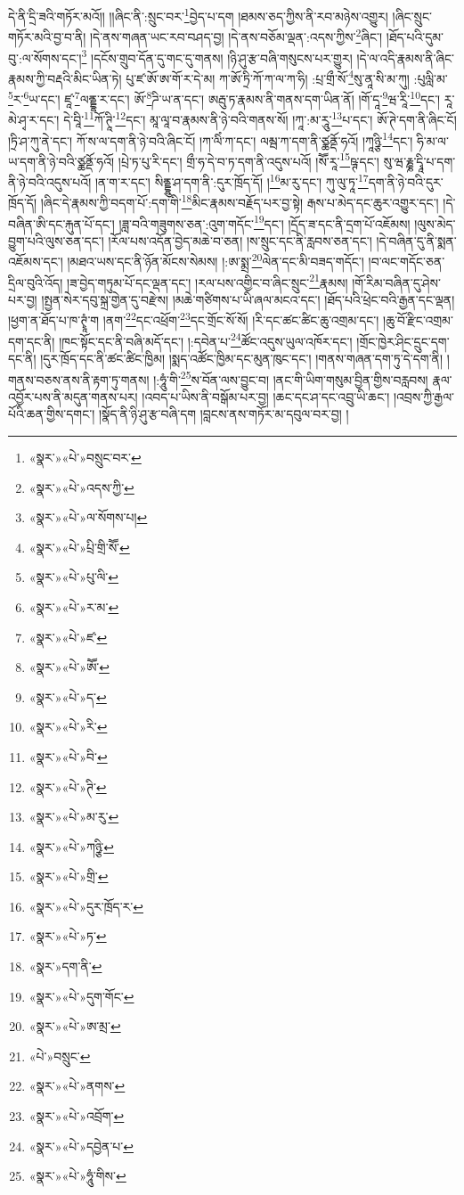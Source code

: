 དེ་ནི་དྲི་ཟའི་གཏོར་མའོ།། །།ཞིང་ནི་:སྲུང་བར་\footnote{«སྣར་»«པེ་»བསྲུང་བར་}བྱེད་པ་དག །ཐམས་ཅད་ཀྱིས་ནི་རབ་མཉེས་འགྱུར། །ཞིང་སྲུང་གཏོར་མའི་བྱ་བ་ནི། །དེ་ནས་གཞན་ཡང་རབ་བཤད་བྱ། །དེ་ནས་བཅོམ་ལྡན་:འདས་ཀྱིས་\footnote{«སྣར་»«པེ་»འདས་ཀྱི་}ཞིང་། །ཐོད་པའི་དུམ་བུ་:ལ་སོགས་དང་།\footnote{«སྣར་»«པེ་»ལ་སོགས་པ།} །དངོས་གྲུབ་དོན་དུ་གང་དུ་གནས། །ཉི་ཤུ་རྩ་བཞི་གསུངས་པར་གྱུར། །དེ་ལ་འདི་རྣམས་ནི་ཞིང་རྣམས་ཀྱི་བརྡའི་མིང་ཡིན་ཏེ། པུ་ཛ་ཨོ་ཨ་གོ་ར་དེ་མ། ཀ་ཨོ་ཏྲི་ཀོ་ཀ་ལ་ཀ་ཧི། :པྲ་གྲྀ་སོ་\footnote{«སྣར་»«པེ་»པྲི་གྲི་སཽ་}སུ་ནཱ་སི་མ་ཀུ། :པུལླི་མ་\footnote{«སྣར་»«པེ་»པུ་ལི་}ར་\footnote{«སྣར་»«པེ་»ར་མ་}ཡ་དང་། ཛཱ་\footnote{«སྣར་»«པེ་»ཛ་}ལནྡྷ་ར་དང་། ཨོ་\footnote{«སྣར་»«པེ་»ཨཽ་}ཌི་ཡ་ན་དང་། ཨརྦུ་ཏ་རྣམས་ནི་གནས་དག་ཡིན་ནོ། །གོ་དཱ་\footnote{«སྣར་»«པེ་»ད་}ཝ་རཱི་\footnote{«སྣར་»«པེ་»རི་}དང་། རཱ་མེ་ཤྭ་ར་དང་། དེ་བཱི་\footnote{«སྣར་»«པེ་»བི་}ཀོ་ཊཱི་\footnote{«སྣར་»«པེ་»ཊི་}དང་། མཱ་ལཱ་བ་རྣམས་ནི་ཉེ་བའི་གནས་སོ། །ཀཱ་:མ་རཱུ་\footnote{«སྣར་»«པེ་»མ་རུ་}པ་དང་། ཨོ་ཊེ་དག་ནི་ཞིང་ངོ། །ཏྲི་ཤ་ཀུ་ནེ་དང་། ཀོ་ས་ལ་དག་ནི་ཉེ་བའི་ཞིང་ངོ། །ཀ་ལིཾ་ཀ་དང་། ལམྦ་ཀ་དག་ནི་ཙྪནྡོ་ཧའོ། །ཀཱཉྩི་\footnote{«སྣར་»«པེ་»ཀཉྩི་}དང་། ཧི་མ་ལ་ཡ་དག་ནི་ཉེ་བའི་ཙྪནྡོ་ཧའོ། །པྲེ་ཏ་པུ་རི་དང་། གྲྀ་ཧ་དེ་བ་ཏ་དག་ནི་འདུས་པའོ། །སཽ་རཱ་\footnote{«སྣར་»«པེ་»གྲི་}ཥྚ་དང་། སུ་ཝ་རྞྞ་དྭཱི་པ་དག་ནི་ཉེ་བའི་འདུས་པའོ། །ན་ག་ར་དང་། སིནྡྷུ་ཤ་དག་ནི་:དུར་ཁྲོད་དོ། །\footnote{«སྣར་»«པེ་»དུར་ཁྲོད་ར་}མ་རུ་དང་། ཀུ་ལུ་ཏཱ་\footnote{«སྣར་»«པེ་»ཏ་}དག་ནི་ཉེ་བའི་དུར་ཁྲོད་དོ། །ཞིང་དེ་རྣམས་ཀྱི་བདག་པོ་:དག་གི་\footnote{«སྣར་»དག་ནི་}མིང་རྣམས་བརྗོད་པར་བྱ་སྟེ། རྒས་པ་མེད་དང་ཆུར་འགྱུར་དང་། །དེ་བཞིན་ཨི་དང་རྐུན་པོ་དང་། །ཟླ་བའི་གཟུགས་ཅན་:འུག་གདོང་\footnote{«སྣར་»«པེ་»དུག་གོང་}དང་། །དྲོད་ཟ་དང་ནི་དྲག་པོ་འཇོམས། །ལུས་མེད་བྱུག་པའི་ལུས་ཅན་དང་། །རོལ་པས་འདོན་བྱེད་མཆེ་བ་ཅན། །ས་སྲུང་དང་ནི་རླབས་ཅན་དང་། །དེ་བཞིན་དུ་ནི་སྨན་འཇོམས་དང་། །མཐའ་ཡས་དང་ནི་ཉོན་མོངས་སེམས། །:ཨ་སྨྲ་\footnote{«སྣར་»«པེ་»ཨ་མྲ་}ལེན་དང་མི་བཟད་གདོང་། །བ་ལང་གདོང་ཅན་དྲིལ་བུའི་འོད། །ཟ་བྱེད་གཏུམ་པོ་དང་ལྡན་དང་། །རལ་པས་འགྱིང་བ་ཞིང་སྲུང་\footnote{«པེ་»བསྲུང་}རྣམས། །གོ་རིམ་བཞིན་དུ་ཤེས་པར་བྱ། །སྤྱན་སེར་དབུ་སྐྲ་གྱེན་དུ་བརྫེས། །མཆེ་གཙིགས་པ་ཡི་ཞལ་མངའ་དང་། །ཐོད་པའི་ཕྲེང་བའི་རྒྱན་དང་ལྡན། །ཕྱག་ན་ཐོད་པ་ཁ་ཊྭཱཾ་ག །ནག་\footnote{«སྣར་»«པེ་»ནགས་}དང་འཕྲོག་\footnote{«སྣར་»«པེ་»འབྲོག་}དང་གྲོང་སོ་སོ། །རི་དང་ཚང་ཚིང་ཆུ་འགྲམ་དང་། །ཆུ་བོ་རྫིང་འགྲམ་དག་དང་ནི། །ཁང་སྟོང་དང་ནི་བཞི་མདོ་དང་། །:དབེན་པ་\footnote{«སྣར་»«པེ་»དབྱེན་པ་}ཚོང་འདུས་ཡུལ་འཁོར་དང་། །གྲོང་ཁྱེར་ཤིང་དྲུང་དག་དང་ནི། །དུར་ཁྲོད་དང་ནི་ཚང་ཚིང་ཁྱིམ། །སྨད་འཚོང་ཁྱིམ་དང་མུན་ཁུང་དང་། །གནས་གཞན་དག་ཏུ་དེ་དག་ནི། །གནས་བཅས་ནས་ནི་རྟག་ཏུ་གནས། །:ཧཱུཾ་གི་\footnote{«སྣར་»«པེ་»ཧཱུཾ་གིས་}ས་བོན་ལས་བྱུང་བ། །ནང་གི་ཡིག་གསུམ་བྱིན་གྱིས་བརླབས། རྣལ་འབྱོར་པས་ནི་མདུན་གནས་པར། །འབད་པ་ཡིས་ནི་བསྒོམ་པར་བྱ། །ཆང་དང་ཤ་དང་འབྲུ་ཡི་ཆང་། །འབྲས་ཀྱི་རྒྱལ་པོའི་ཆན་གྱིས་དགང་། །སྣོད་ནི་ཉི་ཤུ་རྩ་བཞི་དག །བླངས་ནས་གཏོར་མ་དབུལ་བར་བྱ། །
